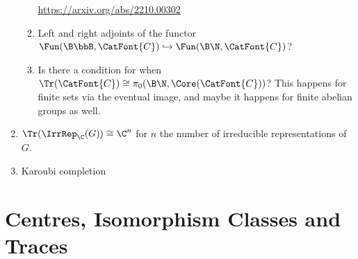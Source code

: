 \begin{enumerate}
\begin{enumerate}
                \url{https://arxiv.org/abs/2210.00302}
            \item Left and right adjoints of the functor $\Fun(\B\bbB,\CatFont{C})\hookrightarrow\Fun(\B\N,\CatFont{C})$?
            \item Is there a condition for when $\Tr(\CatFont{C})\cong\pi_{0}(\B\N,\Core(\CatFont{C}))$? This happens for finite sets via the eventual image, and maybe it happens for finite abelian groups as well.
        \end{enumerate}
    \item $\Tr(\IrrRep_{\C}(G))\cong\C^{n}$ for $n$ the number of irreducible representations of $G$.
    \item Karoubi completion
\end{enumerate}

\ChapterTableOfContents

\section{Centres, Isomorphism Classes and Traces}\label{section-centres-isomorphism-classes-and-traces}
